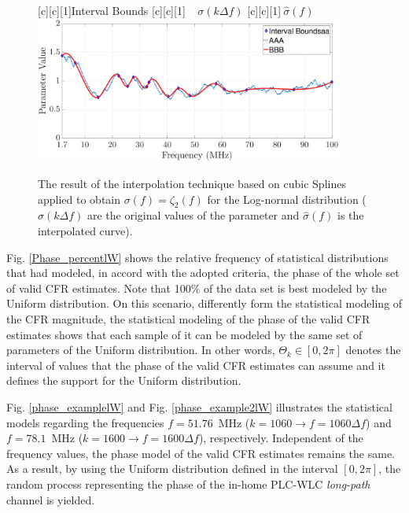 \begin{figure}[h]
	\centering
	[c][1]{Interval Bounds}
	[c][1]{$~~~~~{\sigma}(k \Delta f)$}
	[c][1]{$~\hat{\sigma}(f)$}
	\includegraphics[width=0.9\textwidth]{images/Beta_fitlW.eps}
	\caption{The result of the interpolation technique based on cubic Splines applied to obtain $\sigma(f)=\zeta_2(f)$ for the Log-normal distribution (${\sigma}(k \Delta f)$ are the original values of the parameter and $\hat{\sigma}(f)$ is the interpolated curve).}
	\label{Fit_betalW}
\end{figure}

Fig. \ref{Phase_percentlW} shows the relative frequency of statistical distributions that had modeled, in accord with the adopted criteria, the phase of the whole set of valid \ac{CFR} estimates. Note that 100\% of the data set is best modeled by the Uniform distribution. On this scenario, differently form the statistical modeling of the \ac{CFR} magnitude, the statistical modeling of the phase of the valid \ac{CFR} estimates shows that each sample of it can be modeled by the same set of parameters of the Uniform distribution. In other words, $\Theta_k \in [0, 2\pi]$ denotes the interval of values that the phase of the valid \ac{CFR} estimates can assume and it defines the support for the Uniform distribution. 

Fig. \ref{phase_examplelW} and Fig. \ref{phase_example2lW} illustrates the statistical models regarding the frequencies $f=51.76$~MHz ($k=1060 \rightarrow f = 1060\Delta f$) and $f=78.1$~MHz ($k=1600 \rightarrow f = 1600\Delta f$), respectively. Independent of the frequency values, the phase model of the valid \ac{CFR} estimates remains the same. As a result, by using the Uniform distribution defined in the interval $[0, 2\pi]$, the random process representing the phase of the in-home \ac{PLC}-\ac{WLC} \textit{long-path} channel is yielded.

